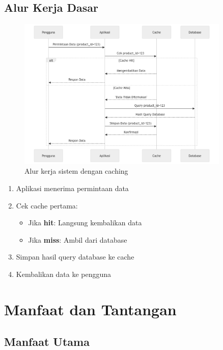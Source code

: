 \documentclass[11pt, a4paper]{book}
\begin{document}
	\subsection{Alur Kerja Dasar}
	\label{subsec:alur-kerja}
	
	\begin{figure}[H]
		\centering
		\includegraphics[width=0.9\textwidth]{images/workflow-cache.png}
		\caption{Alur kerja sistem dengan caching}
		\label{fig:workflow}
	\end{figure}
	
	\begin{enumerate}
		\item Aplikasi menerima permintaan data
		\item Cek cache pertama:
		\begin{itemize}
			\item Jika \textbf{hit}: Langsung kembalikan data
			\item Jika \textbf{miss}: Ambil dari database
		\end{itemize}
		\item Simpan hasil query database ke cache
		\item Kembalikan data ke pengguna
	\end{enumerate}
	
	\section{Manfaat dan Tantangan}
	\label{sec:manfaat-tantangan}
	
	\subsection{Manfaat Utama}
	\label{subsec:manfaat}
	
\end{document}
